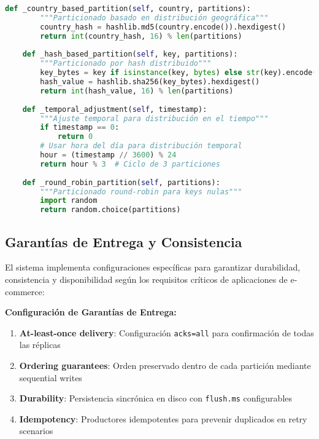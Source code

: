 \begin{lstlisting}[language=python, caption=Implementación de Particionador Personalizado, label=lst:custom_partitioner]
    def _country_based_partition(self, country, partitions):
        """Particionado basado en distribución geográfica"""
        country_hash = hashlib.md5(country.encode()).hexdigest()
        return int(country_hash, 16) % len(partitions)
    
    def _hash_based_partition(self, key, partitions):
        """Particionado por hash distribuido"""
        key_bytes = key if isinstance(key, bytes) else str(key).encode()
        hash_value = hashlib.sha256(key_bytes).hexdigest()
        return int(hash_value, 16) % len(partitions)
    
    def _temporal_adjustment(self, timestamp):
        """Ajuste temporal para distribución en el tiempo"""
        if timestamp == 0:
            return 0
        # Usar hora del día para distribución temporal
        hour = (timestamp // 3600) % 24
        return hour % 3  # Ciclo de 3 particiones
    
    def _round_robin_partition(self, partitions):
        """Particionado round-robin para keys nulas"""
        import random
        return random.choice(partitions)
\end{lstlisting}

\subsection{Garantías de Entrega y Consistencia}
\label{subsec:garantias_consistencia}

El sistema implementa configuraciones específicas para garantizar durabilidad, consistencia y disponibilidad según los requisitos críticos de aplicaciones de e-commerce:

\vspace{0.2cm}

\textbf{Configuración de Garantías de Entrega:}

\begin{enumerate}[leftmargin=*, itemsep=0.1cm]
\item \textbf{At-least-once delivery}: Configuración \texttt{acks=all} para confirmación de todas las réplicas
\item \textbf{Ordering guarantees}: Orden preservado dentro de cada partición mediante sequential writes
\item \textbf{Durability}: Persistencia sincrónica en disco con \texttt{flush.ms} configurables
\item \textbf{Idempotency}: Productores idempotentes para prevenir duplicados en retry scenarios
\end{enumerate}

